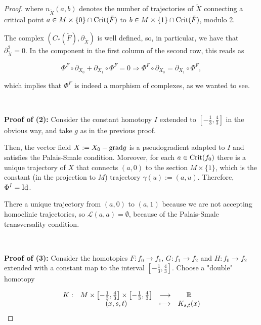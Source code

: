 \begin{proof}
where $n_{\tilde{X}}(a,b)$ denotes the number of trajectories of $\tilde{X}$ connecting a critical point $a \in M \times \{0\} \cap \text{Crit}(\tilde{F})$ to $b \in M \times \{1\} \cap \text{Crit}(\tilde{F})$, modulo 2.

The complex $\left(C_{\ast}(\tilde{F}),\partial_{\tilde{X}}\right)$ is well defined, so, in particular, we have that $\partial_{\tilde{X}}^2 = 0$. In the component in the first column of the second row, this reads as

\begin{displaymath}
\Phi^F \circ \partial_{X_0} + \partial_{X_1} \circ \Phi^F = 0 \Rightarrow \Phi^F \circ \partial_{X_0} = \partial_{X_1} \circ \Phi^F ,
\end{displaymath}

which implies that $\Phi^F$ is indeed a morphism of complexes, as we wanted to see.

\

{\bf Proof of (2):} Consider the constant homotopy $I$ extended to $\left[-\frac13, \frac43\right]$ in the obvious way, and take $g$ as in the previous proof.

Then, the vector field $X := X_0 - \text{grad} g$ is a pseudogradient adapted to $I$ and satisfies the Palais-Smale condition. Moreover, for each $a \in \text{Crit}(f_0)$ there is a unique trajectory of $X$ that connects $(a,0)$ to the section $M \times \{1\}$, which is the constant (in the projection to $M$) trajectory $\gamma(u) := (a,u)$. Therefore, $\Phi^I = \text{Id}$.

\begin{rmrk}
There a unique trajectory from $(a,0)$ to $(a,1)$ because we are not accepting homoclinic trajectories, so $\mathcal{L}(a,a) = \emptyset$, because of the Palais-Smale transversality condition.
\end{rmrk}

\

{\bf Proof of (3):} Consider the homotopies $F : f_0 \rightarrow f_1$, $G : f_1 \rightarrow f_2$ and $H : f_0 \rightarrow f_2$ extended with a constant map to the interval $\left[-\frac13,\frac43\right]$. Choose a "double" homotopy

\begin{displaymath}
\begin{array}{rccc} K : & M \times \left[-\frac13, \frac43\right] \times \left[-\frac13, \frac43\right] & \longrightarrow & \mathbb{R} \\ & (x,s,t) & \longmapsto & K_{s,t}(x) \end{array}
\end{displaymath}


\end{proof}
